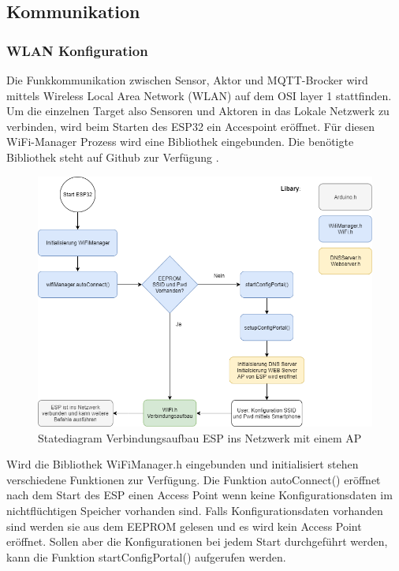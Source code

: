 \subsection{Kommunikation}\label{subsec: Kommunikation} 
\subsubsection{WLAN Konfiguration}\label{subsub: Wlan Konfiguration}
Die Funkkommunikation zwischen Sensor, Aktor und MQTT-Brocker wird mittels Wireless Local Area Network (WLAN) auf dem OSI layer 1 stattfinden. Um die einzelnen Target also Sensoren und Aktoren in das Lokale Netzwerk zu verbinden, wird beim Starten des ESP32 ein Accespoint eröffnet. Für diesen WiFi-Manager Prozess wird eine Bibliothek eingebunden. Die benötigte Bibliothek steht auf Github zur Verfügung \cite{zhouhan0126_zhouhan0126/wifimanager-esp32_2019}. 

\begin{figure}[H]
	\centering
	\includegraphics[width=\textwidth]{graphics/statediagramWiFi.png}
	\caption{Statediagram Verbindungsaufbau ESP ins Netzwerk mit einem AP}
	\label{pic: statediagramWiFi}
\end{figure}   

Wird die Bibliothek WiFiManager.h eingebunden und initialisiert stehen verschiedene Funktionen zur Verfügung. Die Funktion autoConnect() eröffnet nach dem Start des ESP einen Access Point wenn keine Konfigurationsdaten im nichtflüchtigen Speicher vorhanden sind. Falls Konfigurationsdaten vorhanden sind werden sie aus dem EEPROM gelesen und es wird kein Access Point eröffnet. Sollen aber die Konfigurationen bei jedem Start durchgeführt werden, kann die Funktion startConfigPortal() aufgerufen werden.   

